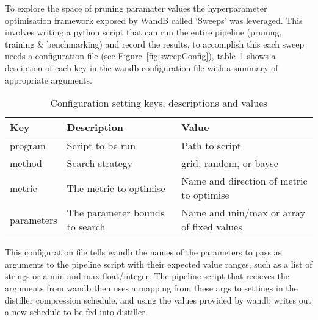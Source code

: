 \documentclass[../Dissertation.tex]{subfiles}
\begin{document}
To explore the space of pruning paramater values the hyperparameter optimisation framework exposed by WandB called `Sweeps' was leveraged. 
This involves writing a python script that can run the entire pipeline (pruning, training \& benchmarking) and record the results, to accomplish this each sweep needs a configuration file (see Figure~\ref{fig:sweepConfig}), table~\ref{tab:WandBConfig} shows a desciption of each key in the wandb configuration file with a summary of appropriate arguments. 



\begin{table}[H]
    \begin{tabular}{@{}|l|l|l|@{}}
    \toprule
    Key        & Description                    & Value                                    \\ \midrule
    program    & Script to be run               & Path to script                           \\ \midrule
    method     & Search strategy                & grid, random, or bayse                   \\ \midrule
    metric     & The metric to optimise         & Name and direction of metric to optimise \\ \midrule
    parameters & The parameter bounds to search & Name and min/max or array of fixed values  \\ \bottomrule
    \end{tabular}
    \caption{Configuration setting keys, descriptions and values}
    \label{tab:WandBConfig}
\end{table}




This configuration file tells wandb the names of the parameters to pass as arguments to the pipeline script with their expected value ranges, such as a list of strings or a min and max float/integer. 
The pipeline script that recieves the arguments from wandb then uses a mapping from these args to settings in the distiller compression schedule, and using the values provided by wandb writes out a new schedule to be fed into distiller. 

\end{document}
